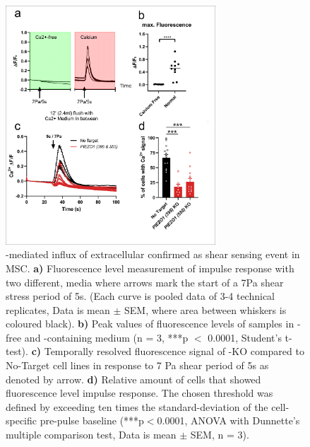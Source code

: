 \begin{figure}
\centering
\includegraphics[width = 0.7\textwidth]{Combined_CalciumFree_KnockOut.png}
\caption{\Piezo{}-mediated influx of extracellular \calciumS confirmed as shear sensing event in MSC. \hfill \newline 
\textbf{a)} Fluorescence level measurement of impulse response with two different, media where arrows mark the start of a 7Pa shear stress period of 5s. (Each curve is pooled data of 3-4 technical replicates, Data is mean $\pm$ SEM, where area between whiskers is coloured black).	
\textbf{b)} Peak values of fluorescence levels of samples in \calcium{}-free and \calcium{}-containing medium (n = 3, ***p $<$ 0.0001, Student's t-test). 
\textbf{c)} Temporally resolved fluorescence signal of \Piezo{}-KO compared to No-Target cell lines in response to 7 Pa shear period of 5s as denoted by arrow. 
\textbf{d)} Relative amount of cells that showed fluorescence level impulse response. The chosen threshold was defined by exceeding ten times the standard-deviation of the cell-specific pre-pulse baseline (***p$<$0.0001, ANOVA with Dunnette's multiple comparison test, Data is mean $\pm$ SEM, n = 3).}
\label{fig:CalcImaging_Cells}
\end{figure}

